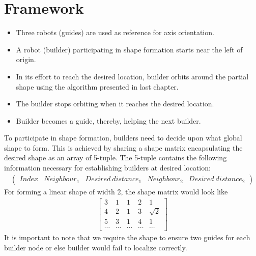 \documentclass{report}[12pt]
\begin{document}
\section{Framework}
\begin{itemize}
	\item Three robots (guides) are used as reference for axis orientation.
	\item A robot (builder) participating in shape formation starts near the left of origin.
	\item In its effort to reach the desired location, builder orbits around the partial shape using the algorithm presented in last chapter.
	\item The builder stops orbiting when it reaches the desired location.
	\item Builder becomes a guide, thereby, helping the next builder.
\end{itemize}
To participate in shape formation, builders need to decide upon what global shape to form. This is achieved by sharing a shape matrix encapsulating the desired shape as an array of 5-tuple. The 5-tuple contains the following information necessary for establishing builders at desired location:
\begin{align}
	\left(
	\begin{matrix}
	Index & Neighbour_1 & Desired\ distance_1 & Neighbour_2 & Desired\ distance_2 
	\end{matrix}
	\right)
\end{align}
For forming a linear shape of width 2, the shape matrix would look like
\begin{align}
	\label{eq:shape_matrix_linear}
	\begin{bmatrix}
	3      & 1      & 1      & 2      & 1        \\
	4      & 2      & 1      & 3      & \sqrt{2} \\
	5      & 3      & 1      & 4      & 1        \\
	\cdots & \cdots & \cdots & \cdots & \cdots   
	\end{bmatrix}
\end{align}
It is important to note that we require the shape to ensure two guides for each builder node or else builder would fail to localize correctly.
\end{document}
